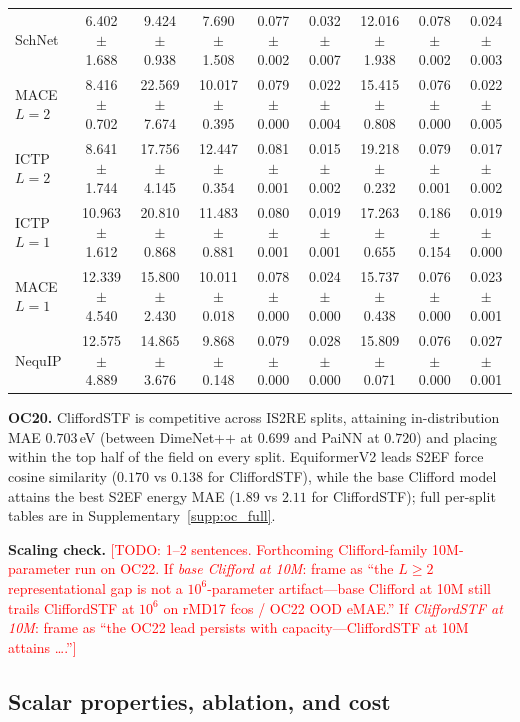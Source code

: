 \begin{table}[t]
{\begin{tabular}{lcccccccc}
SchNet             & 6.402 $\pm$ 1.688 & 9.424 $\pm$ 0.938 & 7.690 $\pm$ 1.508 & 0.077 $\pm$ 0.002 & 0.032 $\pm$ 0.007 & 12.016 $\pm$ 1.938 & 0.078 $\pm$ 0.002 & 0.024 $\pm$ 0.003 \\
MACE $L{=}2$       & 8.416 $\pm$ 0.702 & 22.569 $\pm$ 7.674 & 10.017 $\pm$ 0.395 & 0.079 $\pm$ 0.000 & 0.022 $\pm$ 0.004 & 15.415 $\pm$ 0.808 & 0.076 $\pm$ 0.000 & 0.022 $\pm$ 0.005 \\
ICTP $L{=}2$       & 8.641 $\pm$ 1.744 & 17.756 $\pm$ 4.145 & 12.447 $\pm$ 0.354 & 0.081 $\pm$ 0.001 & 0.015 $\pm$ 0.002 & 19.218 $\pm$ 0.232 & 0.079 $\pm$ 0.001 & 0.017 $\pm$ 0.002 \\
ICTP $L{=}1$       & 10.963 $\pm$ 1.612 & 20.810 $\pm$ 0.868 & 11.483 $\pm$ 0.881 & 0.080 $\pm$ 0.001 & 0.019 $\pm$ 0.001 & 17.263 $\pm$ 0.655 & 0.186 $\pm$ 0.154 & 0.019 $\pm$ 0.000 \\
MACE $L{=}1$       & 12.339 $\pm$ 4.540 & 15.800 $\pm$ 2.430 & 10.011 $\pm$ 0.018 & 0.078 $\pm$ 0.000 & 0.024 $\pm$ 0.000 & 15.737 $\pm$ 0.438 & 0.076 $\pm$ 0.000 & 0.023 $\pm$ 0.001 \\
NequIP             & 12.575 $\pm$ 4.889 & 14.865 $\pm$ 3.676 & 9.868 $\pm$ 0.148 & 0.079 $\pm$ 0.000 & 0.028 $\pm$ 0.000 & 15.809 $\pm$ 0.071 & 0.076 $\pm$ 0.000 & 0.027 $\pm$ 0.001 \\
\bottomrule
\end{tabular}%
}
\end{table}

\textbf{OC20.} CliffordSTF is competitive across IS2RE splits, attaining in-distribution MAE $0.703$\,eV (between DimeNet++ at $0.699$ and PaiNN at $0.720$) and placing within the top half of the field on every split. EquiformerV2 leads S2EF force cosine similarity ($0.170$ vs $0.138$ for CliffordSTF), while the base Clifford model attains the best S2EF energy MAE ($1.89$ vs $2.11$ for CliffordSTF); full per-split tables are in Supplementary~\ref{supp:oc_full}.

\textbf{Scaling check.} \textcolor{red}{[TODO: 1--2 sentences. Forthcoming Clifford-family 10M-parameter run on OC22. If \emph{base Clifford at 10M}: frame as ``the $L\!\geq\!2$ representational gap is not a $10^6$-parameter artifact---base Clifford at 10M still trails CliffordSTF at $10^6$ on rMD17 fcos / OC22 OOD eMAE.'' If \emph{CliffordSTF at 10M}: frame as ``the OC22 lead persists with capacity---CliffordSTF at 10M attains \dots.'']}

\subsection{Scalar properties, ablation, and cost}\label{sec:results_scalar}


